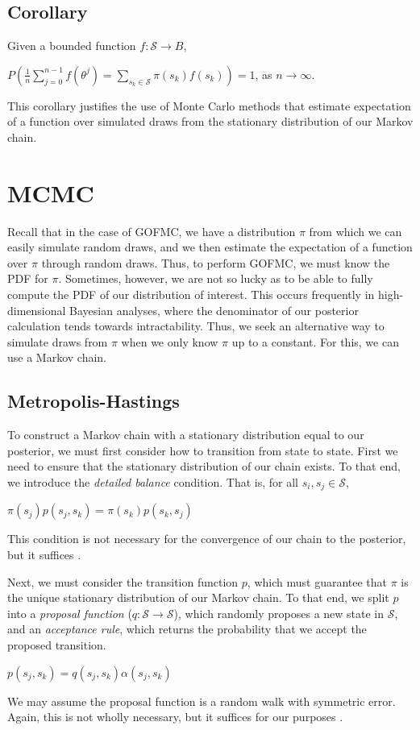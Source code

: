 \documentclass[12pt,twoside]{reedthesis}
\begin{document}
		\subsection*{Corollary}
		Given a bounded function $f: \mathcal{S} \rightarrow B$,
		\begin{center}
			$P\left( \displaystyle \frac{1}{n} \sum_{j=0}^{n-1} f(\theta^{j}) 
			= \sum_{s_k \in \mathcal S} \pi(s_k) f(s_k) \right) = 1$, as $n \longrightarrow \infty$.
		\end{center}
		This corollary justifies the use of Monte Carlo methods that estimate expectation of a function over simulated draws from the stationary distribution of our Markov chain.
	\section{MCMC}
			Recall that in the case of GOFMC, we have a distribution $\pi$ from which we can easily simulate random draws, and we then estimate the expectation of a function over $\pi$ through random draws. Thus, to perform GOFMC, we must know the PDF for $\pi$. Sometimes, however, we are not so lucky as to be able to fully compute the PDF of our distribution of interest. This occurs frequently in high-dimensional Bayesian analyses, where the denominator of our posterior calculation tends towards intractability. Thus, we seek an alternative way to simulate draws from $\pi$ when we only know $\pi$ up to a constant. For this, we can use a Markov chain.
		\subsection*{Metropolis-Hastings}
			To construct a Markov chain with a stationary distribution equal to our posterior, we must first consider how to transition from state to state. 
			First we need to ensure that the stationary distribution of our chain exists. 
			To that end, we introduce the {\em detailed balance} condition. That is, for all $s_i, s_j \in \mathcal S$,
			\begin{center}
			$ \pi(s_j) p(s_j,s_k) = \pi(s_k) p(s_k,s_j) $
			\end{center}
			This condition is not necessary for the convergence of our chain to the posterior, but it suffices \cite{mcmc}.
			
			Next, we must consider the transition function $p$, which must guarantee that $\pi$ is the unique stationary distribution of our Markov chain. 
			To that end, we split $p$ into a {\em proposal function} ($q: \mathcal S \rightarrow \mathcal S$), which randomly proposes a new state in $\mathcal S$, and an {\em acceptance rule}, which returns the probability that we accept the proposed transition.
			\begin{center}
			$
			p(s_j,s_k) = q(s_j,s_k) \alpha(s_j,s_k)
			$
			\end{center}
			We may assume the proposal function is a random walk with symmetric error.
			Again, this is not wholly necessary, but it suffices for our purposes \cite{mcmc}.
			
\end{document}
